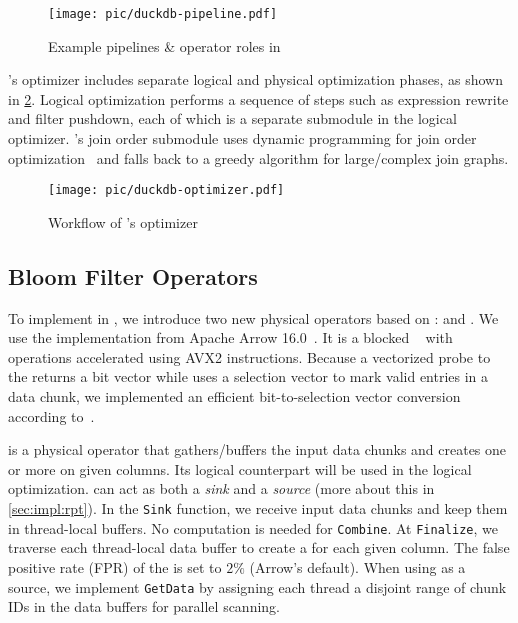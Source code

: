 \begin{figure}[t!]
    \centering
    \texttt{[image: pic/duckdb-pipeline.pdf]}
    \caption{Example pipelines \& operator roles in \duckdb~\cite{2023DuckDBPPT}}
    \label{fig:duckdb-pipeline}
\end{figure}


\duckdb's optimizer includes separate logical and physical optimization phases, as shown in \cref{fig:duckdb-optimizer}. Logical optimization performs a sequence of steps such as expression rewrite and filter pushdown, each of which is a separate submodule in the logical optimizer. \duckdb's join order submodule uses dynamic programming for join order optimization~\cite{2008dphyper} and falls back to a greedy algorithm for large/complex join graphs.

\begin{figure}[t!]
    \centering
    \texttt{[image: pic/duckdb-optimizer.pdf]}
    \caption{Workflow of \duckdb's optimizer}
    \label{fig:duckdb-optimizer}
\end{figure}

\subsection{Bloom Filter Operators}
\label{sec:impl:bf}

To implement \RPT in \duckdb, we introduce two new physical operators based on \BFs: \CreateBF and \UseBF. We use the \BF implementation from Apache Arrow 16.0~\cite{Arrow}. It is a blocked \BF~\cite{putze2007cache} with operations accelerated using AVX2 instructions. Because a vectorized probe to the \BF returns a bit vector while \duckdb uses a selection vector to mark valid entries in a data chunk, we implemented an efficient bit-to-selection vector conversion according to~\cite{bitvector2selvec}.

\CreateBF is a physical operator that gathers/buffers the input data chunks and creates one or more \BFs on given columns. Its logical counterpart \LogicalCreateBF will be used in the logical optimization. \CreateBF can act as both a \emph{sink} and a \emph{source} (more about this in \cref{sec:impl:rpt}). In the \texttt{Sink} function, we receive input data chunks and keep them in thread-local buffers. No computation is needed for \texttt{Combine}. At \texttt{Finalize}, we traverse each thread-local data buffer to create a \BF for each given column. The false positive rate (FPR) of the \BF is set to $2\%$ (Arrow's default). When using \CreateBF as a source, we implement \texttt{GetData} by assigning each thread a disjoint range of chunk IDs in the data buffers for parallel scanning.

